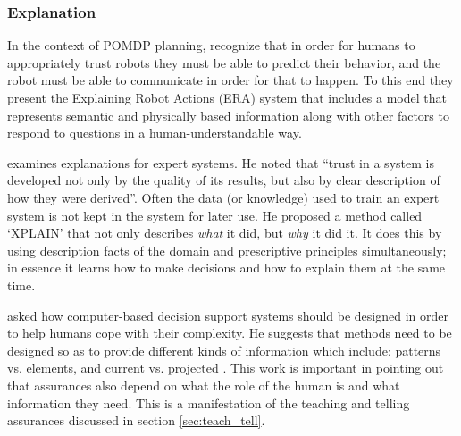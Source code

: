 %

\subsubsection{Explanation}
    In the context of POMDP planning, \citet{Lomas2012-ie} recognize that in order for humans to appropriately trust robots they must be able to predict their behavior, and the robot must be able to communicate in order for that to happen. To this end they present the Explaining Robot Actions (ERA) system that includes a model that represents semantic and physically based information along with other factors to respond to questions in a human-understandable way. 

    \citet{Swartout1983-ko} examines explanations for expert systems. He noted that ``trust in a system is developed not only by the quality of its results, but also by clear description of how they were derived''. Often the data (or knowledge) used to train an expert system is not kept in the system for later use. He proposed a method called `XPLAIN' that not only describes \emph{what} it did, but \emph{why} it did it. It does this by using description facts of the domain and prescriptive principles simultaneously; in essence it learns how to make decisions and how to explain them at the same time. 

    \citet{Rouse1986-dz} asked how computer-based decision support systems should be designed in order to help humans cope with their complexity. He suggests that methods need to be designed so as to provide different kinds of information which include: patterns vs. elements, and current vs. projected . This work is important in pointing out that assurances also depend on what the role of the human is and what information they need. This is a manifestation of the teaching and telling assurances discussed in section \ref{sec:teach_tell}.

